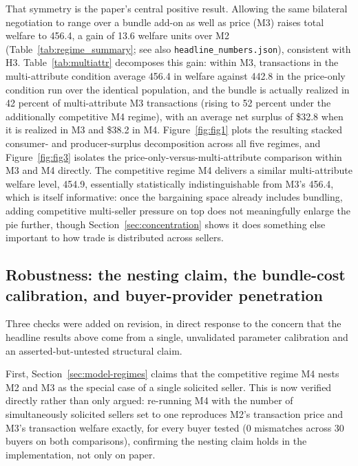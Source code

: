 \documentclass[review]{elsarticle}
\begin{document}
That symmetry is the paper's central positive result. Allowing the same bilateral negotiation to range over a bundle add-on as well as price (M3) raises total welfare to 456.4, a gain of 13.6 welfare units over M2 (Table~\ref{tab:regime_summary}; see also \texttt{headline\_numbers.json}), consistent with H3. Table~\ref{tab:multiattr} decomposes this gain: within M3, transactions in the multi-attribute condition average 456.4 in welfare against 442.8 in the price-only condition run over the identical population, and the bundle is actually realized in 42 percent of multi-attribute M3 transactions (rising to 52 percent under the additionally competitive M4 regime), with an average net surplus of \$32.8 when it is realized in M3 and \$38.2 in M4. Figure~\ref{fig:fig1} plots the resulting stacked consumer- and producer-surplus decomposition across all five regimes, and Figure~\ref{fig:fig3} isolates the price-only-versus-multi-attribute comparison within M3 and M4 directly. The competitive regime M4 delivers a similar multi-attribute welfare level, 454.9, essentially statistically indistinguishable from M3's 456.4, which is itself informative: once the bargaining space already includes bundling, adding competitive multi-seller pressure on top does not meaningfully enlarge the pie further, though Section~\ref{sec:concentration} shows it does something else important to how trade is distributed across sellers.

\FloatBarrier
\subsection{Robustness: the nesting claim, the bundle-cost calibration, and buyer-provider penetration}
\label{sec:robustness}

Three checks were added on revision, in direct response to the concern that the headline results above come from a single, unvalidated parameter calibration and an asserted-but-untested structural claim.

First, Section~\ref{sec:model-regimes} claims that the competitive regime M4 nests M2 and M3 as the special case of a single solicited seller. This is now verified directly rather than only argued: re-running M4 with the number of simultaneously solicited sellers set to one reproduces M2's transaction price and M3's transaction welfare exactly, for every buyer tested (0 mismatches across 30 buyers on both comparisons), confirming the nesting claim holds in the implementation, not only on paper.
\end{document}
